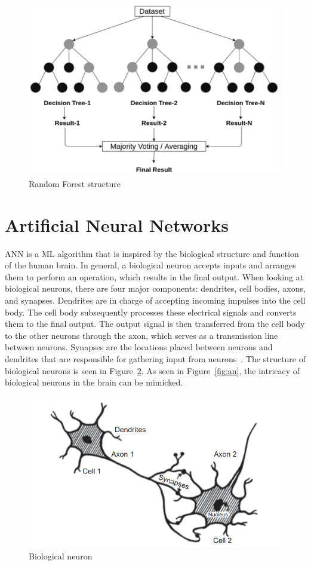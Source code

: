 \begin{figure}[htbp]
    \centering
    \includegraphics[width=0.65\linewidth]{Chapters/Figures/random_forest_cavalo.png}
    \caption{Random Forest structure~\cite{Sarker2021MachineDirections}}
    \label{fig:random_forest2}
\end{figure}

\section{Artificial Neural Networks}

\gls{ANN} is a \gls{ML} algorithm that is inspired by the biological structure and function of the human brain. In general, a biological neuron accepts inputs and arranges them to perform an operation, which results in the final output. When looking at biological neurons, there are four major components: dendrites, cell bodies, axons, and synapses. Dendrites are in charge of accepting incoming impulses into the cell body. The cell body subsequently processes these electrical signals and converts them to the final output. The output signal is then transferred from the cell body to the other neurons through the axon, which serves as a transmission line between neurons. Synapses are the locations placed between neurons and dendrites that are responsible for gathering input from neurons~\cite{Imran2019AClassification}. The structure of biological neurons is seen in Figure~\ref{fig:neuron}. As seen in Figure~\ref{fig:an}, the intricacy of biological neurons in the brain can be mimicked.
    
    \begin{figure}[htbp]
        \centering
        \includegraphics[width=0.75\linewidth]{Chapters/Figures/neuron.png}
        \caption{Biological neuron~\cite{Deyoung1990ThinkingResearch}}
        \label{fig:neuron}
    \end{figure}
    
